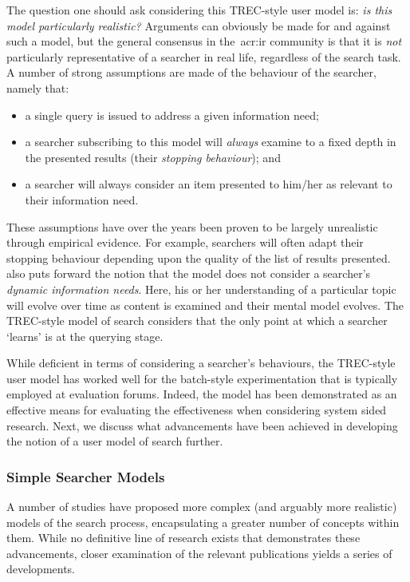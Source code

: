The question one should ask considering this TREC-style user model is: \emph{is this model particularly realistic?} Arguments can obviously be made for and against such a model, but the general consensus in the~\gls{acr:ir} community is that it is \emph{not} particularly representative of a searcher in real life, regardless of the search task. A number of strong assumptions are made of the behaviour of the searcher, namely that:

\begin{itemize}
    \item{a single query is issued to address a given information need;}
    \item{a searcher subscribing to this model will \emph{always} examine to a fixed depth in the presented results (their \emph{stopping behaviour}); and}
    \item{a searcher will always consider an item presented to him/her as relevant to their information need.}
\end{itemize}

These assumptions have over the years been proven to be largely unrealistic through empirical evidence. For example, searchers will often adapt their stopping behaviour depending upon the quality of the list of results presented.~\cite{borlund2003iir_model} also puts forward the notion that the model does not consider a searcher's \emph{dynamic information needs}. Here, his or her understanding of a particular topic will evolve over time as content is examined and their mental model evolves. The TREC-style model of search considers that the only point at which a searcher `learns' is at the querying stage.

While deficient in terms of considering a searcher's behaviours, the TREC-style user model has worked well for the batch-style experimentation that is typically employed at evaluation forums. Indeed, the model has been demonstrated as an effective means for evaluating the effectiveness when considering system sided research. Next, we discuss what advancements have been achieved in developing the notion of a user model of search further.

\subsubsection{Simple Searcher Models}
A number of studies have proposed more complex (and arguably more realistic) models of the search process, encapsulating a greater number of concepts within them. While no definitive line of research exists that demonstrates these advancements, closer examination of the relevant publications yields a series of developments.

